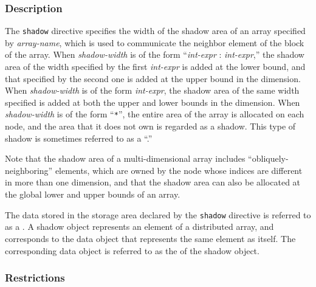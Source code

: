 \subsubsection*{Description}

The {\tt shadow} directive specifies the width of the shadow area of an
array specified by {\it array-name}, which is used to communicate the
neighbor element of the block of the array.
%
When {\it shadow-width} is of the form ``{\it int-expr} : {\it
int-expr},'' the shadow area of the width specified by the first {\it
int-expr} is added at the lower bound, and that specified by the second
one is added at the upper bound in the dimension.
%
When {\it shadow-width} is of the form {\it int-expr}, the shadow
area of the same width specified is added at both the upper and lower
bounds in the dimension.
%
When {\it shadow-width} is of the form ``\verb|*|'', the entire area of
the array is allocated on each node, and the area that it does not
own is regarded as a shadow.
%
This type of shadow is sometimes referred to as a ``.''

Note that the shadow area of a multi-dimensional array includes
``obliquely-neighboring'' elements, which are owned by the node 
whose indices are different in more than one dimension, and that the
shadow area can also be allocated at the global lower and upper bounds of
an array.

The data stored in the storage area declared by the {\tt shadow}
directive is referred to as a {\it {}}.
%
A shadow object represents an element of a distributed array, and 
corresponds to the data object that represents the same
element as itself. The corresponding data object is referred to as the
{\it {}} of the shadow object.



\subsubsection*{Restrictions}

